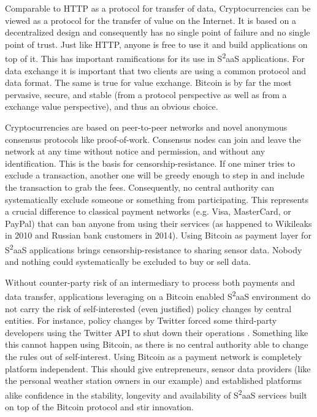 Comparable to \ac{HTTP} as a protocol for transfer of data, Cryptocurrencies can be viewed as a protocol for the transfer of value on the Internet. It is based on a decentralized design and consequently has no single point of failure and no single point of trust. Just like \ac{HTTP}, anyone is free to use it and build applications on top of it. This has important ramifications for its use in S\textsuperscript{2}aaS applications. For data exchange it is important that two clients are using a common protocol and data format. The same is true for value exchange. Bitcoin is by far the most pervasive, secure, and stable (from a protocol perspective as well as from a exchange value perspective), and thus an obvious choice.

Cryptocurrencies are based on peer-to-peer networks and novel anonymous consensus protocols like proof-of-work. Consensus nodes can join and leave the network at any time without notice and permission, and without any identification. This is the basis for censorship-resistance. If one miner tries to exclude a transaction, another one will be greedy enough to step in and include the transaction to grab the fees. Consequently, no central authority can systematically exclude someone or something from participating. This represents a crucial difference to classical payment networks (e.g. Visa, MasterCard, or PayPal) that can ban anyone from using their services (as happened to Wikileaks in 2010 and Russian bank customers in 2014). Using Bitcoin as payment layer for S\textsuperscript{2}aaS applications brings censorship-resistance to sharing sensor data. Nobody and nothing could systematically be excluded to buy or sell data.

Without counter-party risk of an intermediary to process both payments and data transfer, applications leveraging on a Bitcoin enabled S\textsuperscript{2}aaS  environment do not carry the risk of self-interested (even justified) policy changes by central entities. For instance, policy changes by Twitter forced some third-party developers using the Twitter API to shut down their operations \parencite{twitterAPI}. Something like this cannot happen using Bitcoin, as there is no central authority able to change the rules out of self-interest. Using Bitcoin as a payment network is completely platform independent. This should give entrepreneurs, sensor data providers (like the personal weather station owners in our example) and established platforms alike confidence in the stability, longevity and availability of S\textsuperscript{2}aaS services built on top of the Bitcoin protocol and stir innovation.

